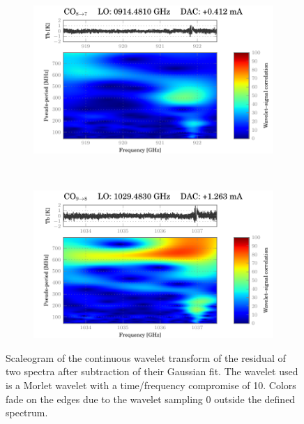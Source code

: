 \begin{figure}[p]
    \centering
    \begin{subfigure}[b]{\textwidth}
        \centering
        \includegraphics[width=\textwidth]{50015e1d_WBS-H-USB_04-16_fit_wavelet}
    \end{subfigure}\\
    \begin{subfigure}[b]{\textwidth}
        \centering
        \includegraphics[width=\textwidth]{50015d89_WBS-H-USB_00-12_fit_wavelet}
    \end{subfigure}
    \caption{
        Scaleogram of the continuous wavelet transform
        of the residual of two spectra after subtraction of their Gaussian fit.
        The wavelet used is a Morlet wavelet with a time/frequency compromise of 10.
        Colors fade on the edges due to the wavelet sampling 0 outside the defined spectrum.
    }
    \label{fig:wavelet}
\end{figure}

